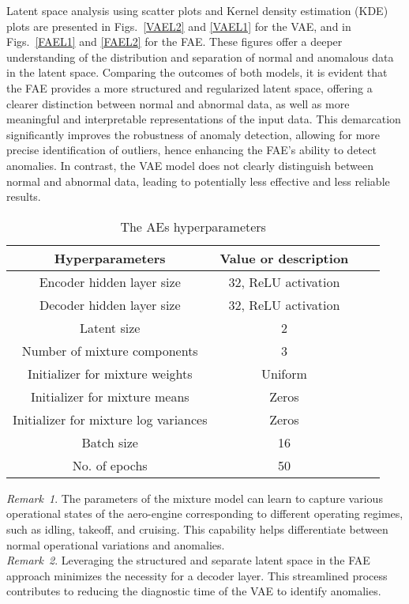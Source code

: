 \documentclass[journal]{IEEEtran}
\begin{document}
Latent space analysis using scatter plots and Kernel density estimation (KDE) plots are presented in Figs.~\ref{VAEL2} and \ref{VAEL1} for the VAE, and in Figs.~\ref{FAEL1} and \ref{FAEL2} for the FAE. These figures offer a deeper understanding of the distribution and separation of normal and anomalous data in the latent space. Comparing the outcomes of both models, it is evident that the FAE provides a more structured and regularized latent space, offering a clearer distinction between normal and abnormal data, as well as more meaningful and interpretable representations of the input data. This demarcation significantly improves the robustness of anomaly detection, allowing for more precise identification of outliers, hence enhancing the FAE's ability to detect anomalies. In contrast, the VAE model does not clearly distinguish between normal and abnormal data, leading to potentially less effective and less reliable results.\\
\begin{table}
    \centering
    \caption{The AEs hyperparameters}
    \begin{tabular}{|c|c|c|c|}
        \hline
        Hyperparameters & Value or description \\
        \hline  
        Encoder hidden layer size & 32, ReLU activation\\
        Decoder hidden layer size & 32, ReLU activation\\
        Latent size & 2\\
        Number of mixture components & 3\\
        Initializer for mixture weights & Uniform\\
        Initializer for mixture means & Zeros\\
        Initializer for mixture log variances & Zeros\\
        Batch size & 16\\
        No. of epochs  & 50\\

        \hline
    \end{tabular}
    \label{tab:1}
\end{table}
\textit{Remark~1}. The parameters of the mixture model can learn to capture various operational states of the aero-engine corresponding to different operating regimes, such as idling, takeoff, and cruising. This capability helps differentiate between normal operational variations and anomalies.\\
\textit{Remark~2}. Leveraging the structured and separate latent space in the FAE approach minimizes the necessity for a decoder layer. This streamlined process contributes to reducing the diagnostic time of the VAE to identify anomalies.
\end{document}
